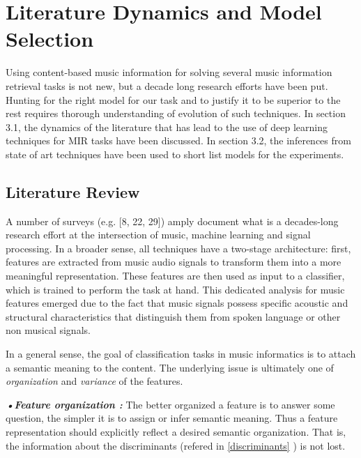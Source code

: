 

\chapter{Literature Dynamics and Model Selection } %

\label{Chapter3} %

Using content-based music information for solving several music information retrieval tasks is not new, but a decade long research efforts have been put. Hunting for the right model for our task and to justify it to be superior to the rest requires thorough understanding of evolution of such techniques. In section 3.1, the dynamics of the literature that has lead to the use of deep learning techniques for MIR tasks have been discussed. In section 3.2, the inferences from state of art techniques have been used to short list models for the experiments.       


\section{Literature Review}
\label{literature}
A number of surveys (e.g. [8, 22, 29]) amply document what is a decades-long research effort at the intersection of music, machine learning and signal processing. In a broader sense, all techniques have a two-stage architecture: first, features are extracted from music audio signals to transform them into a more meaningful representation. These features are then used as input to a classifier, which is trained to perform the task at hand. This dedicated analysis for music features emerged due to the fact that music signals possess specific acoustic and structural characteristics that distinguish them from spoken language or other non musical signals.
\bigskip

\noindent In a general sense, the goal of classification tasks in music informatics is to attach a semantic meaning to the content. The underlying issue is ultimately one of \textit{organization} and \textit{variance} of the features. 
\bigskip

\noindent \textit{\textbf{•Feature organization :}} The better organized a feature is to answer some question, the simpler it is to assign or infer semantic meaning. Thus a feature representation should explicitly reflect a desired semantic organization. That is, the information about the discriminants (refered in \ref{discriminants} ) is not lost.

